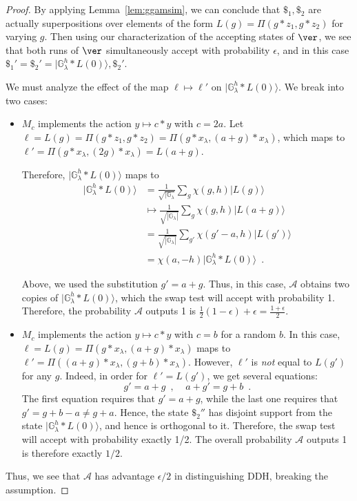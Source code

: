 \documentclass{article}\usepackage[a4paper,margin=20mm]{geometry}
\numberwithin{theorem}{section}
\numberwithin{equation}{section}
\newcommand{\G}{\mathbb{G}}
\newcommand{\As}{{\mathcal{A}}}
\begin{document}
\begin{proof}
	By applying Lemma~\ref{lem:ggamsim}, we can conclude that $\$_1,\$_2$ are actually superpositions over elements of the form $L(g)=\Pi(g*z_1,g*z_2)$ for varying $g$. Then using our characterization of the accepting states of $\ver$, we see that both runs of $\ver$ simultaneously accept with probability $\epsilon$, and in this case $\$_1'=\$_2'=|\G_\lambda^h*L(0)\rangle,\$_2'$.
	
	We must analyze the effect of the map $\ell\mapsto\ell'$ on $|\G_\lambda^{h}*L(0)\rangle$. We break into two cases:
	\begin{itemize}
		\item $M_c$ implements the action $y\mapsto c*y$ with $c=2a$. Let $\ell=L(g)=\Pi(g*z_1,g*z_2)=\Pi(g*x_\lambda,(a+g)*x_\lambda)$, which maps to $\ell'=\Pi(g*x_\lambda,(2g)*x_\lambda)=L(a+g)$.
		
		Therefore, $|\G_\lambda^{h}*L(0)\rangle$ maps to
		\begin{align*}|\G_\lambda^{h}*L(0)\rangle&=\frac{1}{\sqrt{|\G_\lambda}}\sum_g \chi(g,h)|L(g)\rangle\\&\mapsto\frac{1}{\sqrt{|\G_\lambda|}}\sum_g \chi(g,h)|L(a+g)\rangle\\&=\frac{1}{\sqrt{|\G_\lambda|}}\sum_{g'} \chi(g'-a,h)|L(g')\rangle\\&=\chi(a,-h)|\G_\lambda^{h}*L(0)\rangle\enspace .\end{align*}
		
		Above, we used the substitution $g'=a+g$. Thus, in this case, $\As$ obtains two copies of $|\G_\lambda^{h}*L(0)\rangle$, which the swap test will accept with probability 1. Therefore, the probability $\As$ outputs 1 is $\frac{1}{2}(1-\epsilon)+\epsilon=\frac{1+\epsilon}{2}$.
		
		
		\item $M_c$ implements the action $y\mapsto c*y$ with $c=b$ for a random $b$. In this case, $\ell=L(g)=\Pi(g*x_\lambda,(a+g)*x_\lambda)$ maps to $\ell'=\Pi((a+g)*x_\lambda,(g+b)*x_\lambda)$. However, $\ell'$ is \emph{not} equal to $L(g')$ for any $g$. Indeed, in order for $\ell'=L(g')$, we get several equations:
		\[g'=a+g\enspace ,\;\;\;\;a+g'=g+b\enspace .\]
		The first equation requires that $g'=a+g$, while the last one requires that $g'=g+b-a\neq g+a$. Hence, the state $\$_2''$ has disjoint support from the state $|\G_\lambda^{h}*L(0)\rangle$, and hence is orthogonal to it. Therefore, the swap test will accept with probability exactly 1/2. The overall probability $\As$ outputs 1 is therefore exactly $1/2$.
	\end{itemize}
	Thus, we see that $\As$ has advantage $\epsilon/2$ in distinguishing DDH, breaking the assumption.
\end{proof}
\end{document}
